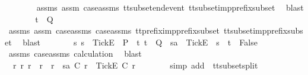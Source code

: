 \begin{isabellebody}
\ \ \ \ \ \ \isamarkupfalse%
\ {\isasymrho}{\isacharunderscore}assms\ assm{}\ case{\isacharunderscore}assms{\isacharparenleft}{}{\isacharparenright}\ tt{\isacharunderscore}subset{\isacharunderscore}end{\isacharunderscore}event\ tt{\isacharunderscore}subset{\isacharunderscore}imp{\isacharunderscore}prefix{\isacharunderscore}subset\ \isamarkupfalse%
\ blast\isanewline
\ \ \ \ \isamarkupfalse%
\ \isamarkupfalse%
\ {\isachardoublequoteopen}t{\isacharprime}{\isacharprime}\ {\isasymin}\ Q{\isachardoublequoteclose}\isanewline
\ \ \ \ \ \ \isamarkupfalse%
\ {\isasymrho}{\isacharunderscore}assms\ assm{}\ case{\isacharunderscore}assms{\isacharparenleft}{}{\isacharparenright}\ case{\isacharunderscore}assms{}{\isacharparenleft}{}{\isacharparenright}\ tt{\isacharunderscore}prefix{\isacharunderscore}imp{\isacharunderscore}prefix{\isacharunderscore}subset\ tt{\isacharunderscore}subset{\isacharunderscore}imp{\isacharunderscore}prefix{\isacharunderscore}subset\ \isamarkupfalse%
\ blast\isanewline
\ \ \ \ \isamarkupfalse%
\ \isamarkupfalse%
\ {\isachardoublequoteopen}{\isasymforall}s{\isachardot}\ s\ {\isacharat}\ {\isacharbrackleft}{\isacharbrackleft}Tick{\isacharbrackright}\isactrlsub E{\isacharbrackright}\ {\isasymin}\ P\ {\isasymlongrightarrow}\ {\isacharparenleft}{\isasymforall}t{\isachardot}\ t\ {\isasymin}\ Q\ {\isasymlongrightarrow}\ sa\ {\isacharat}\ {\isacharbrackleft}{\isacharbrackleft}Tick{\isacharbrackright}\isactrlsub E{\isacharbrackright}\ {\isasymnoteq}\ s\ {\isacharat}\ t{\isacharparenright}\ {\isasymLongrightarrow}\ False{\isachardoublequoteclose}\isanewline
\ \ \ \ \ \ \isamarkupfalse%
\ {\isasymrho}{\isacharunderscore}assms\ case{\isacharunderscore}assms\ calculation\ \isamarkupfalse%
\ blast\isanewline
\ \ \isamarkupfalse%
\isanewline
\ \ \ \ \isamarkupfalse%
\ {\isachardoublequoteopen}{\isasymexists}\ r{}\ r{}{\isachardot}\ r\ {\isacharequal}\ r{}\ {\isacharat}\ r{}\ {\isasymand}\ sa\ {\isasymsubseteq}\isactrlsub C\ r{}\ {\isasymand}\ {\isacharbrackleft}{\isacharbrackleft}Tick{\isacharbrackright}\isactrlsub E{\isacharbrackright}\ {\isasymsubseteq}\isactrlsub C\ r{}{\isachardoublequoteclose}\isanewline
\ \ \ \ \ \ \isamarkupfalse%
\ {\isacharparenleft}simp\ add{\isacharcolon}\ {\isachardoublequoteopen}{}{\isachardoublequoteclose}\ tt{\isacharunderscore}subset{\isacharunderscore}split{}{\isacharparenright}\isanewline

\end{isabellebody}
